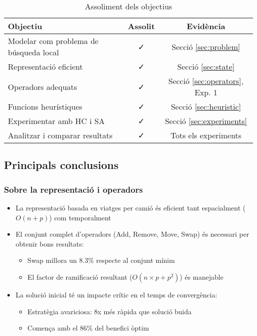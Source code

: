 \begin{table}[H]
\centering
\begin{tabular}{@{}lcc@{}}
\toprule
\textbf{Objectiu} & \textbf{Assolit} & \textbf{Evidència} \\
\midrule
Modelar com problema de búsqueda local & ✓ & Secció \ref{sec:problem} \\
Representació eficient & ✓ & Secció \ref{sec:state} \\
Operadors adequats & ✓ & Secció \ref{sec:operators}, Exp. 1 \\
Funcions heurístiques & ✓ & Secció \ref{sec:heuristic} \\
Experimentar amb HC i SA & ✓ & Secció \ref{sec:experiments} \\
Analitzar i comparar resultats & ✓ & Tots els experiments \\
\bottomrule
\end{tabular}
\caption{Assoliment dels objectius}
\label{tab:objectius-assolits}
\end{table}

\subsection{Principals conclusions}

\subsubsection{Sobre la representació i operadors}

\begin{itemize}
    \item La representació basada en viatges per camió és eficient tant espacialment ($O(n+p)$) com temporalment
    
    \item El conjunt complet d'operadors (Add, Remove, Move, Swap) és necessari per obtenir bons resultats:
    \begin{itemize}
        \item Swap millora un 8.3\% respecte al conjunt mínim
        \item El factor de ramificació resultant ($O(n \times p + p^2)$) és manejable
    \end{itemize}
    
    \item La solució inicial té un impacte crític en el temps de convergència:
    \begin{itemize}
        \item Estratègia avariciosa: 8x més ràpida que solució buida
        \item Comença amb el 86\% del benefici òptim
    \end{itemize}
\end{itemize}

